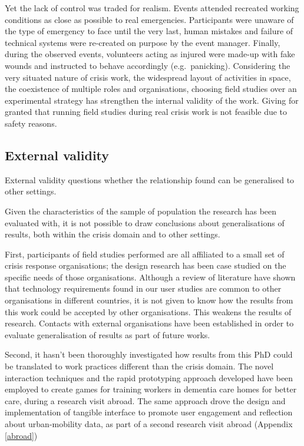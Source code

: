 Yet the lack of control was traded for realism. Events attended recreated working conditions as close as possible to real emergencies. Participants were unaware of the type of emergency to face until the very last, human mistakes and failure of technical systems were re-created on purpose by the event manager. Finally, during the observed events, volunteers acting as injured were made-up with fake wounds and instructed to behave accordingly (e.g.~panicking). Considering the very situated nature of crisis work, the widespread layout of activities in space, the coexistence of multiple roles and organisations, choosing field studies over an experimental strategy has strengthen the internal validity of the work. Giving for granted that running field studies during real crisis work is not feasible due to safety reasons.

\subsection{External validity}\label{external-validity}

External validity questions whether the relationship found can be generalised to other settings.

Given the characteristics of the sample of population the research has been evaluated with, it is not possible to draw conclusions about generalisations of results, both within the crisis domain and to other settings.

First, participants of field studies performed are all affiliated to a small set of crisis response organisations; the design research has been case studied on the specific needs of those organisations. Although a review of literature have shown that technology requirements found in our user studies are common to other organisations in different countries, it is not given to know how the results from this work could be accepted by other organisations. This weakens the results of research. Contacts with external organisations have been established in order to evaluate generalisation of results as part of future works.

Second, it hasn't been thoroughly investigated how results from this PhD could be translated to work practices different than the crisis domain. The novel interaction techniques and the rapid prototyping approach developed have been employed to create games for training workers in dementia care homes for better care, during a research visit abroad. The same approach drove the design and implementation of tangible interface to promote user engagement and reflection about urban-mobility data, as part of a second research visit abroad (Appendix \ref{abroad})


